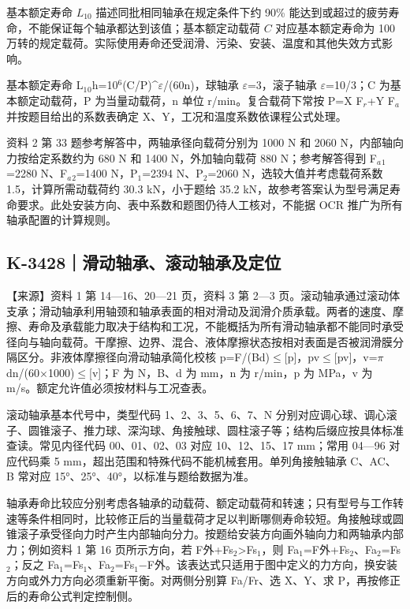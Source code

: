 \documentclass[zihao=5,a4paper,UTF8,fontset=fandol]{ctexart}
\begin{document}
基本额定寿命 $L_{10}$ 描述同批相同轴承在规定条件下约 90\% 能达到或超过的疲劳寿命，不能保证每个轴承都达到该值；基本额定动载荷 $C$ 对应基本额定寿命为 100 万转的规定载荷。实际使用寿命还受润滑、污染、安装、温度和其他失效方式影响。


基本额定寿命 L$_{1}$$_{0}$h=10$^{6}$(C/P)\textasciicircum{}$\varepsilon$/(60n)，球轴承 $\varepsilon$=3，滚子轴承 $\varepsilon$=10/3；C 为基本额定动载荷，P 为当量动载荷，n 单位 r/min。复合载荷下常按 P=X F$_{r}$+Y F$_{a}$ 并按题目给出的系数表确定 X、Y，工况和温度系数依课程公式处理。


资料 2 第 33 题参考解答中，两轴承径向载荷分别为 1000 N 和 2060 N，内部轴向力按给定系数约为 680 N 和 1400 N，外加轴向载荷 880 N；参考解答得到 F$_{a}$$_{1}$=2280 N、F$_{a}$$_{2}$=1400 N，P$_{1}$=2394 N、P$_{2}$=2060 N，选较大值并考虑载荷系数 1.5，计算所需动载荷约 30.3 kN，小于题给 35.2 kN，故参考答案认为型号满足寿命要求。此处安装方向、表中系数和题图仍待人工核对，不能据 OCR 推广为所有轴承配置的计算规则。





\subsection{K-3428｜滑动轴承、滚动轴承及定位}
\label{k-3428}

【来源】资料 1 第 14—16、20—21 页，资料 3 第 2—3 页。滚动轴承通过滚动体支承；滑动轴承利用轴颈和轴承表面的相对滑动及润滑介质承载。两者的速度、摩擦、寿命及承载能力取决于结构和工况，不能概括为所有滑动轴承都不能同时承受径向与轴向载荷。干摩擦、边界、混合、液体摩擦状态按相对表面是否被润滑膜分隔区分。非液体摩擦径向滑动轴承简化校核 p=F/(Bd)$\le$[p]，pv$\le$[pv]，v=$\pi$dn/(60$\times$1000)$\le$[v]；F 为 N，B、d 为 mm，n 为 r/min，p 为 MPa，v 为 m/s。额定允许值必须按材料与工况查表。


滚动轴承基本代号中，类型代码 1、2、3、5、6、7、N 分别对应调心球、调心滚子、圆锥滚子、推力球、深沟球、角接触球、圆柱滚子等；结构后缀应按具体标准查读。常见内径代码 00、01、02、03 对应 10、12、15、17 mm；常用 04—96 对应代码乘 5 mm，超出范围和特殊代码不能机械套用。单列角接触轴承 C、AC、B 常对应 15°、25°、40°，以标准与题给数据为准。


轴承寿命比较应分别考虑各轴承的动载荷、额定动载荷和转速；只有型号与工作转速等条件相同时，比较修正后的当量载荷才足以判断哪侧寿命较短。角接触球或圆锥滚子承受径向力时产生内部轴向分力。按题给安装方向画外轴向力和两轴承内部力；例如资料 1 第 16 页所示方向，若 F外+Fs$_{2}$>Fs$_{1}$，则 Fa$_{1}$=F外+Fs$_{2}$、Fa$_{2}$=Fs$_{2}$；反之 Fa$_{1}$=Fs$_{1}$、Fa$_{2}$=Fs$_{1}$$-$F外。该表达式只适用于图中定义的力方向，换安装方向或外力方向必须重新平衡。对两侧分别算 Fa/Fr、选 X、Y、求 P，再按修正后的寿命公式判定控制侧。
\end{document}
